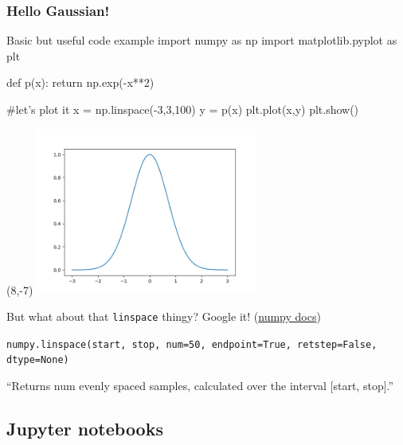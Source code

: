 \documentclass[hyperref={colorlinks=true}]{beamer}
\begin{document}
\begin{frame}[fragile]
  \frametitle{Hello Gaussian!}

\begin{ucpythonblock}{Basic but useful code example}
import numpy as np
import matplotlib.pyplot as plt

def p(x):
    return np.exp(-x**2)
    
#let's plot it
x = np.linspace(-3,3,100)
y = p(x)
plt.plot(x,y)
plt.show()
\end{ucpythonblock}
  
  \pause

  \begin{textblock}{12}(8,-7)
    \includegraphics[width=0.55\textwidth]{../Lecture1/Gaussian.png}
  \end{textblock}  
  
  \pause
  
  But what about that \texttt{linspace} thingy? Google it! (\href{https://docs.scipy.org/doc/numpy-1.15.0/reference/generated/numpy.linspace.html}{numpy docs})
  
  \texttt{numpy.linspace(start, stop, num=50, endpoint=True, retstep=False, dtype=None)}
  
  ``Returns num evenly spaced samples, calculated over the interval [start, stop].''
  
\end{frame}

\subsection[Jupyter notebooks]{Jupyter notebooks}
\end{document}
